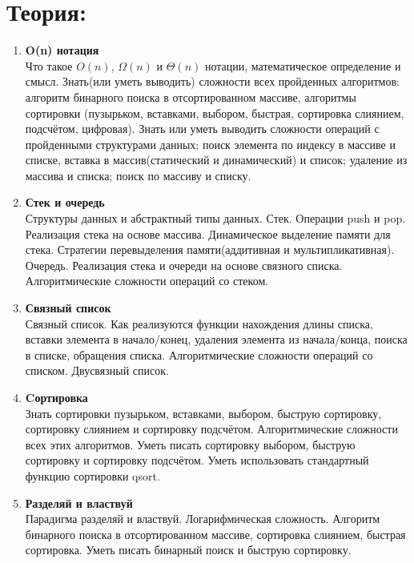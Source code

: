 \documentclass{article}
\begin{document}

\section*{Теория:}
\begin{enumerate}

\item  \textbf{O(n) нотация}\\
Что такое $O(n)$, $\Omega(n)$ и $\Theta(n)$ нотации, математическое определение и смысл.
Знать(или уметь выводить) сложности всех пройденных алгоритмов: алгоритм бинарного поиска в отсортированном массиве, алгоритмы сортировки (пузырьком, вставками, выбором, быстрая, сортировка слиянием, подсчётом, цифровая). Знать или уметь выводить сложности операций с пройденными структурами данных: поиск элемента по индексу в массиве и списке, вставка в массив(статический и динамический) и список; удаление из массива и списка; поиск по массиву и списку.\\

\item  \textbf{Стек и очередь}\\
Структуры данных и абстрактный типы данных. Стек. Операции push и pop. Реализация стека на основе массива. Динамическое выделение памяти для стека. Стратегии перевыделения памяти(аддитивная и мультипликативная).  Очередь. Реализация стека и очереди на основе связного списка. Алгоритмические сложности операций со стеком.\\

\item \textbf{Связный список}\\
Связный список. Как реализуются функции нахождения длины списка, вставки элемента в начало/конец, удаления элемента из начала/конца, поиска в списке, обращения списка. Алгоритмические сложности операций со списком. Двусвязный список.\\


\item \textbf{Cортировка}\\
Знать сортировки пузырьком, вставками, выбором, быструю сортировку, сортировку слиянием и сортировку подсчётом. Алгоритмические сложности всех этих алгоритмов. Уметь писать сортировку выбором, быструю сортировку и сортировку подсчётом. Уметь использовать стандартный функцию сортировки qsort.\\

\item \textbf{Разделяй и властвуй}\\
Парадигма разделяй и властвуй. Логарифмическая сложность. Алгоритм бинарного поиска в отсортированном массиве, сортировка слиянием, быстрая сортировка. Уметь писать бинарный поиск и быструю сортировку.\\


\end{enumerate}
\end{document}
